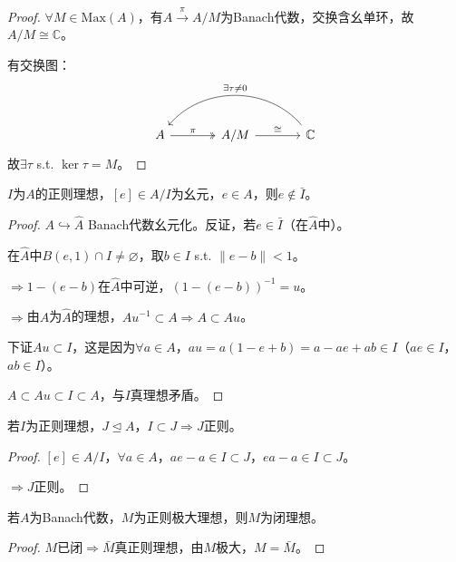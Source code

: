 \documentclass[lang=cn,a4paper,newtx,section]{elegantbook}
\begin{document}
\begin{proof}
  $\forall M \in \mathrm{Max}(A)$，有$A \xrightarrow{\pi} A/M$为Banach代数，交换含幺单环，故$A/M \cong \mathbb{C}$。
  
  有交换图：
  \begin{equation*}
    \begin{tikzcd}[column sep=large]
      A \arrow[r, "\pi", two heads] & A/M \arrow[r, "\cong"] & \mathbb{C} \arrow[ll, bend right=50, "\exists \tau \neq 0"']
    \end{tikzcd}
  \end{equation*}
  故$\exists \tau$ s.t. $\ker\tau = M$。
\end{proof}

\begin{proposition}
  $I$为$A$的正则理想，$[e] \in A/I$为幺元，$e \in A$，则$e \notin \bar{I}$。
\end{proposition}

\begin{proof}
  $A \hookrightarrow \hat{A}$ Banach代数幺元化。反证，若$e \in \bar{I}$（在$\hat{A}$中）。
  
  在$\hat{A}$中$B(e, 1) \cap I \neq \varnothing$，取$b \in I$ s.t. $\|e - b\| < 1$。
  
  $\Rightarrow 1 - (e - b)$在$\hat{A}$中可逆，$(1 - (e - b))^{-1} = u$。
  
  $\Rightarrow$由$A$为$\hat{A}$的理想，$Au^{-1} \subset A \Rightarrow A \subset Au$。
  
  下证$Au \subset I$，这是因为$\forall a \in A$，$au = a(1 - e + b) = a - ae + ab \in I$（$ae \in I$，$ab \in I$）。
  
  $A \subset Au \subset I \subset A$，与$I$真理想矛盾。
\end{proof}

\begin{proposition}
  若$I$为正则理想，$J \trianglelefteq A$，$I \subset J \Rightarrow J$正则。
\end{proposition}

\begin{proof}
  $[e] \in A/I$，$\forall a \in A$，$ae - a \in I \subset J$，$ea - a \in I \subset J$。
  
  $\Rightarrow J$正则。
\end{proof}

\begin{proposition}
  若$A$为Banach代数，$M$为正则极大理想，则$M$为闭理想。
\end{proposition}

\begin{proof}
  $M$已闭$\Rightarrow \bar{M}$真正则理想，由$M$极大，$M = \bar{M}$。
\end{proof}
\end{document}

